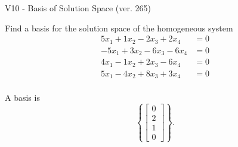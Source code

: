 \begin{exercise}
  \begin{exerciseTitle}V10 - Basis of Solution Space (ver. 265)\end{exerciseTitle}
  \begin{exerciseStatement}
    Find a basis for the solution space of the homogeneous system 
\begin{align*}
 5 x_ 1 + 1 x_ 2 -2 x_ 3 + 2 x_ 4 &= 0  \\ 
  -5 x_ 1 + 3 x_ 2 -6 x_ 3 -6 x_ 4 &= 0  \\ 
  4 x_ 1 -1 x_ 2 + 2 x_ 3 -6 x_ 4 &= 0  \\ 
  5 x_ 1 -4 x_ 2 + 8 x_ 3 + 3 x_ 4 &= 0  \\ 
 \end{align*}


 
  \end{exerciseStatement}

  \begin{exerciseAnswer}
   A basis is   
\[\left\{\left[\begin{array}{c}
0 \\
2 \\
1 \\
0
\end{array}\right]\right\}.\]

  


  \end{exerciseAnswer}
\end{exercise}